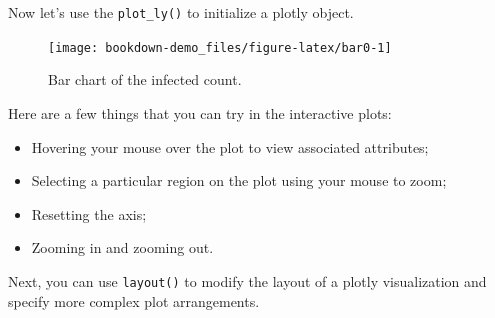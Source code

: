 \documentclass[]{book}
\newenvironment{Shaded}{\begin{snugshade}}{\end{snugshade}}
\newcommand{\KeywordTok}[1]{\textcolor[rgb]{0.13,0.29,0.53}{\textbf{#1}}}
\newcommand{\DataTypeTok}[1]{\textcolor[rgb]{0.13,0.29,0.53}{#1}}
\newcommand{\StringTok}[1]{\textcolor[rgb]{0.31,0.60,0.02}{#1}}
\newcommand{\OperatorTok}[1]{\textcolor[rgb]{0.81,0.36,0.00}{\textbf{#1}}}
\newcommand{\NormalTok}[1]{#1}
\providecommand{\tightlist}{%
  \setlength{\itemsep}{0pt}\setlength{\parskip}{0pt}}
\begin{document}
Now let's use the \texttt{plot\_ly()} to initialize a plotly object.

\begin{Shaded}
\end{Shaded}

\begin{figure}

{\centering \texttt{[image: bookdown-demo\_files/figure-latex/bar0-1]} 

}

\caption{Bar chart of the infected count.}\label{fig:bar0}
\end{figure}

Here are a few things that you can try in the interactive plots:

\begin{itemize}
\tightlist
\item
  Hovering your mouse over the plot to view associated attributes;
\item
  Selecting a particular region on the plot using your mouse to zoom;
\item
  Resetting the axis;
\item
  Zooming in and zooming out.
\end{itemize}

Next, you can use \texttt{layout()} to modify the layout of a plotly
visualization and specify more complex plot arrangements.

\begin{Shaded}
\end{Shaded}
\end{document}
